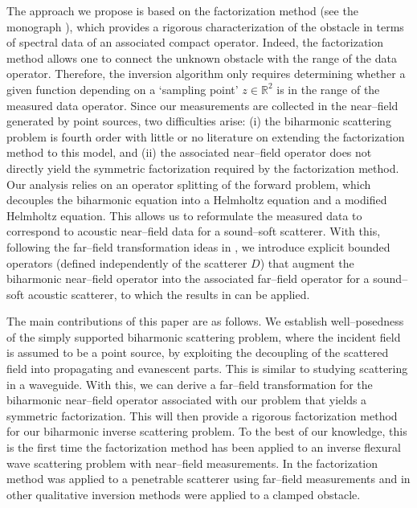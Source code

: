\documentclass{article}
\newcommand{\R}{\mathbb{R}}
\numberwithin{equation}{section}
\begin{document}
The approach we propose is based on the factorization method (see the monograph \cite{kirschbook}), which provides a rigorous characterization of the obstacle in terms of spectral data of an associated compact operator. Indeed, the factorization method allows one to connect the unknown obstacle with the range of the data operator. Therefore, the inversion algorithm only requires determining whether a given function depending on a `sampling point' $z\in \R^2$ is in the range of the measured data operator. Since our measurements are collected in the near--field generated by point sources, two difficulties arise: (i) the biharmonic scattering problem is fourth order with little or no literature on extending the factorization method to this model, and (ii) the associated near--field operator does not directly yield the symmetric factorization required by the factorization method. Our analysis relies on an operator splitting of the forward problem, which decouples the biharmonic equation into a Helmholtz equation and a modified Helmholtz equation. This allows us to reformulate the measured data to correspond to acoustic near--field data for a sound--soft scatterer. With this, following the far--field transformation ideas in \cite{nf-fft-dsm}, we introduce explicit bounded operators (defined independently of the scatterer $D$) that augment the biharmonic near--field operator into the associated far--field operator for a sound--soft acoustic scatterer, to which the results in \cite{kirschbook} can be applied.


The main contributions of this paper are as follows. We establish well--posedness of the simply supported biharmonic scattering problem, where the incident field is assumed to be a point source, by exploiting the decoupling of the scattered field into propagating and evanescent parts. This is similar to studying scattering in a waveguide. With this, we can derive a far--field transformation for the biharmonic near--field operator associated with our problem that yields a symmetric factorization. This will then provide a rigorous factorization method for our biharmonic inverse scattering problem. To the best of our knowledge, this is the first time the factorization method has been applied to an inverse flexural wave scattering problem with near--field measurements. In \cite{FM-wRafaGen} the factorization method was applied to a penetrable scatterer using far--field measurements and in \cite{near-lsmBH,DSM-BH24,LSM-BH25} other qualitative inversion methods were applied to a clamped obstacle. 
\end{document}
